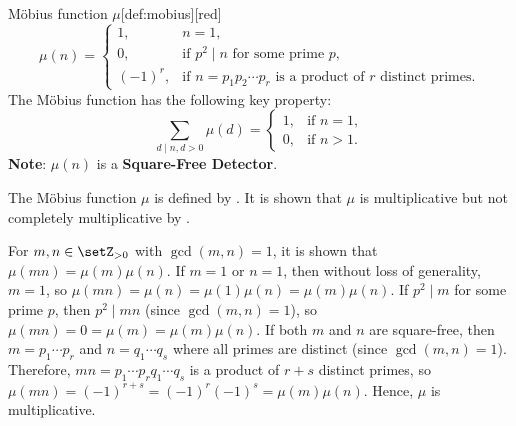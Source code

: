 \begin{enumerate}
\begin{define}{Möbius function $\mu$}[def:mobius][red]
    \[
    \mu(n)=
    \begin{cases}
    1,& n=1,\\[4pt]
    0,&\text{if } p^2\mid n \text{ for some prime } p,\\[4pt]
    (-1)^r,&\text{if } n=p_1p_2\cdots p_r \text{ is a product of } r \text{ distinct primes.}
    \end{cases}
    \]
    The Möbius function has the following key property:
    \[
    \sum_{d \mid n, d>0} \mu(d) = \begin{cases}
    1, & \text{if } n=1,\\
    0, & \text{if } n>1.
    \end{cases}
    \]
    \textbf{Note}: $\mu(n)$ is a \textbf{Square-Free Detector}.
  \end{define}
  \begin{subprove}
    The Möbius function $\mu$ is defined by . 
    It is shown that $\mu$ is multiplicative but not completely multiplicative by .
    
    For $m, n \in \setZ_{>0}$ with $\gcd(m,n) = 1$, it is shown that $\mu(mn) = \mu(m)\mu(n)$.
    If $m = 1$ or $n = 1$, then without loss of generality, $m = 1$, so $\mu(mn) = \mu(n) = \mu(1)\mu(n) = \mu(m)\mu(n)$.
    If $p^2 \mid m$ for some prime $p$, then $p^2 \mid mn$ (since $\gcd(m,n) = 1$), so $\mu(mn) = 0 = \mu(m) = \mu(m)\mu(n)$.
    If both $m$ and $n$ are square-free, then $m = p_1 \cdots p_r$ and $n = q_1 \cdots q_s$ where all primes are distinct (since $\gcd(m,n) = 1$).
    Therefore, $mn = p_1 \cdots p_r q_1 \cdots q_s$ is a product of $r+s$ distinct primes, so $\mu(mn) = (-1)^{r+s} = (-1)^r (-1)^s = \mu(m)\mu(n)$.
    Hence, $\mu$ is multiplicative.
    

\end{subprove}
\end{enumerate}
